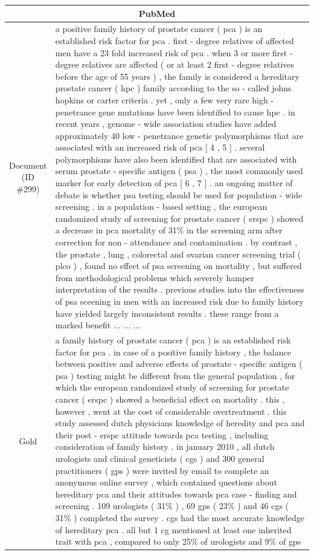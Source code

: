 \begin{table}[bth!]
\scriptsize
\centering
\renewcommand{\arraystretch}{1.3}
\begin{tabular}{c|p{}}
\hline
\multicolumn{2}{c}{PubMed} \\ \hline
\makecell{Document\\(ID \#299)} & 
a positive family history of prostate cancer ( pca ) is an established risk factor for pca . first - degree relatives of affected men have a 23 fold increased risk of pca . when 3 or more first - degree relatives are affected ( or at least 2 first - degree relatives before the age of 55 years ) , the family is considered a hereditary prostate cancer ( hpc ) family according to the so - called johns hopkins or carter criteria . yet , only a few very rare high - penetrance gene mutations have been identified to cause hpc . in recent years , genome - wide association studies have added approximately 40 low - penetrance genetic polymorphisms that are associated with an increased risk of pca [ 4 , 5 ] . several polymorphisms have also been identified that are associated with serum prostate - specific antigen ( psa ) , the most commonly used marker for early detection of pca [ 6 , 7 ] . an ongoing matter of debate is whether psa testing should be used for population - wide screening . in a population - based setting , the european randomized study of screening for prostate cancer ( erspc ) showed a decrease in pca mortality of 31\% in the screening arm after correction for non - attendance and contamination . by contrast , the prostate , lung , colorectal and ovarian cancer screening trial ( plco ) , found no effect of psa screening on mortality , but suffered from methodological problems which severely hamper interpretation of the results . previous studies into the effectiveness of psa sceening in men with an increased risk due to family history have yielded largely inconsistent results . these range from a marked benefit ... ... ... 
\\ \hline
Gold & 
a family history of prostate cancer ( pca ) is an established risk factor for pca . in case of a positive family history , the balance between positive and adverse effects of prostate - specific antigen ( psa ) testing might be different from the general population , for which the european randomized study of screening for prostate cancer ( erspc ) showed a beneficial effect on mortality . this , however , went at the cost of considerable overtreatment . this study assessed dutch physicians knowledge of heredity and pca and their post - erspc attitude towards pca testing , including consideration of family history . in january 2010 , all dutch urologists and clinical geneticists ( cgs ) and 300 general practitioners ( gps ) were invited by email to complete an anonymous online survey , which contained questions about hereditary pca and their attitudes towards pca case - finding and screening . 109 urologists ( 31\% ) , 69 gps ( 23\% ) and 46 cgs ( 31\% ) completed the survey . cgs had the most accurate knowledge of hereditary pca . all but 1 cg mentioned at least one inherited trait with pca , compared to only 25\% of urologists and 9\% of gps

\end{tabular}
\end{table}
